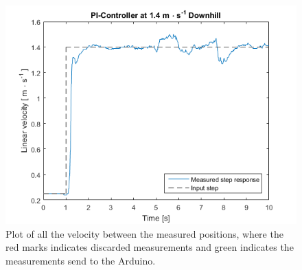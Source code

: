 \begin{figure}[H]
  \centering
	\includegraphics[scale=0.8]{figures/AccTest8D.png}
	\caption{Plot of all the velocity between the measured positions, where the red marks indicates discarded measurements and green indicates the measurements send to the Arduino.}
	\label{AccT8Dfig}
\end{figure}